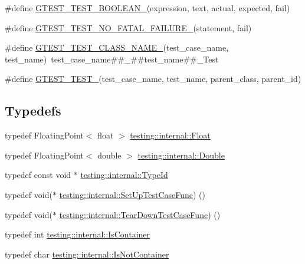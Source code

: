 \begin{DoxyCompactItemize}
\item 
\#define \mbox{\hyperlink{gtest-internal_8h_ae8912365e1d00a7a2bd248268c64aa1a}{G\+T\+E\+S\+T\+\_\+\+T\+E\+S\+T\+\_\+\+B\+O\+O\+L\+E\+A\+N\+\_\+}}(expression,  text,  actual,  expected,  fail)
\item 
\#define \mbox{\hyperlink{gtest-internal_8h_a1b37a3c446836d33040f3266a6236081}{G\+T\+E\+S\+T\+\_\+\+T\+E\+S\+T\+\_\+\+N\+O\+\_\+\+F\+A\+T\+A\+L\+\_\+\+F\+A\+I\+L\+U\+R\+E\+\_\+}}(statement,  fail)
\item 
\#define \mbox{\hyperlink{gtest-internal_8h_a87a1ee3a3b9b798195236d053f2e5dcc}{G\+T\+E\+S\+T\+\_\+\+T\+E\+S\+T\+\_\+\+C\+L\+A\+S\+S\+\_\+\+N\+A\+M\+E\+\_\+}}(test\+\_\+case\+\_\+name,  test\+\_\+name)~test\+\_\+case\+\_\+name\#\#\+\_\+\#\#test\+\_\+name\#\#\+\_\+\+Test
\item 
\#define \mbox{\hyperlink{gtest-internal_8h_ae2d26f0f92fbaf62bf4c1eca45bb2f1f}{G\+T\+E\+S\+T\+\_\+\+T\+E\+S\+T\+\_\+}}(test\+\_\+case\+\_\+name,  test\+\_\+name,  parent\+\_\+class,  parent\+\_\+id)
\end{DoxyCompactItemize}
\subsection*{Typedefs}
\begin{DoxyCompactItemize}
\item 
typedef Floating\+Point$<$ float $>$ \mbox{\hyperlink{namespacetesting_1_1internal_a02e1981f5ff70609e6ac06e006ff519a}{testing\+::internal\+::\+Float}}
\item 
typedef Floating\+Point$<$ double $>$ \mbox{\hyperlink{namespacetesting_1_1internal_a66a7579b1893b260c31dad577f7a5c48}{testing\+::internal\+::\+Double}}
\item 
typedef const void $\ast$ \mbox{\hyperlink{namespacetesting_1_1internal_ab1114197d3c657d8b7f8e0c5caa12d00}{testing\+::internal\+::\+Type\+Id}}
\item 
typedef void($\ast$ \mbox{\hyperlink{namespacetesting_1_1internal_a30037044c0b57cdd647c7e2e97cb2cff}{testing\+::internal\+::\+Set\+Up\+Test\+Case\+Func}}) ()
\item 
typedef void($\ast$ \mbox{\hyperlink{namespacetesting_1_1internal_a085e31321d0d029c04d2a79234f60c1a}{testing\+::internal\+::\+Tear\+Down\+Test\+Case\+Func}}) ()
\item 
typedef int \mbox{\hyperlink{namespacetesting_1_1internal_ad8f0c2883245f1df2a53618a49f0deb3}{testing\+::internal\+::\+Is\+Container}}
\item 
typedef char \mbox{\hyperlink{namespacetesting_1_1internal_abf080521ce135deb510e0a7830fd3d33}{testing\+::internal\+::\+Is\+Not\+Container}}
\end{DoxyCompactItemize}
